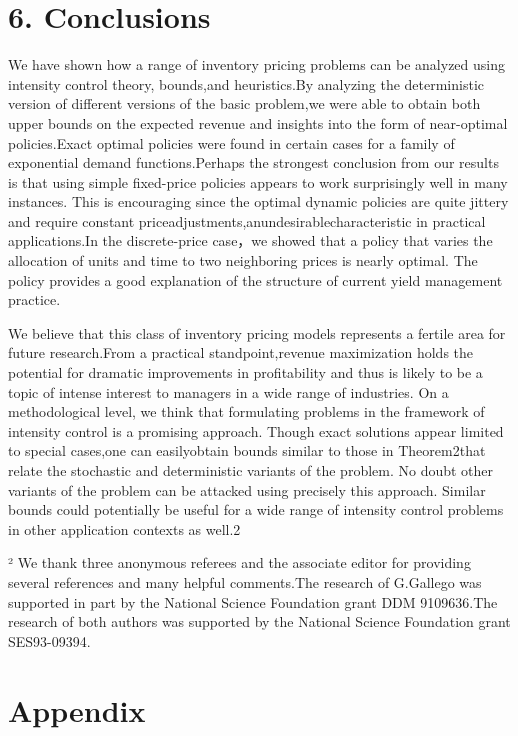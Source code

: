 \section{6. Conclusions}\label{conclusions}

We have shown how a range of inventory pricing problems can be analyzed
using intensity control theory, bounds,and heuristics.By analyzing the
deterministic version of different versions of the basic problem,we were
able to obtain both upper bounds on the expected revenue and insights
into the form of near-optimal policies.Exact optimal policies were found
in certain cases for a family of exponential demand functions.Perhaps
the strongest conclusion from our results is that using simple
fixed-price policies appears to work surprisingly well in many
instances. This is encouraging since the optimal dynamic policies are
quite jittery and require constant
priceadjustments,anundesirablecharacteristic in practical
applications.In the discrete-price case，we showed that a policy that
varies the allocation of units and time to two neighboring prices is
nearly optimal. The policy provides a good explanation of the structure
of current yield management practice.

We believe that this class of inventory pricing models represents a
fertile area for future research.From a practical standpoint,revenue
maximization holds the potential for dramatic improvements in
profitability and thus is likely to be a topic of intense interest to
managers in a wide range of industries. On a methodological level, we
think that formulating problems in the framework of intensity control is
a promising approach. Though exact solutions appear limited to special
cases,one can easilyobtain bounds similar to those in Theorem2that
relate the stochastic and deterministic variants of the problem. No
doubt other variants of the problem can be attacked using precisely this
approach. Similar bounds could potentially be useful for a wide range of
intensity control problems in other application contexts as well.2

² We thank three anonymous referees and the associate editor for
providing several references and many helpful comments.The research of
G.Gallego was supported in part by the National Science Foundation grant
DDM 9109636.The research of both authors was supported by the National
Science Foundation grant SES93-09394.

\section{Appendix}\label{appendix}

